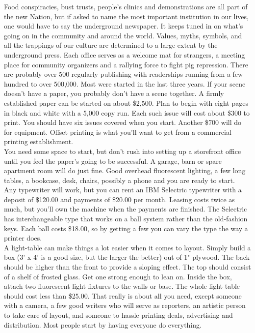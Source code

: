 \documentclass[11pt,twoside,a4paper]{book}
\begin{document}
Food conspiracies, bust trusts, people's clinics and demonstrations are all part of the new Nation, but if asked to name the most important institution in our lives, one would have to say the underground newspaper. It keeps tuned in on what's going on in the community and around the world. Values, myths, symbols, and all the trappings of our culture are determined to a large extent by the underground press. Each office serves as a welcome mat for strangers, a meeting place for community organizers and a rallying force to fight pig repression. There are probably over 500 regularly publishing with readerships running from a few hundred to over 500,000. Most were started in the last three years. If your scene doesn't have a paper, you probably don't have a scene together. A firmly established paper can be started on about \$2,500. Plan to begin with eight pages in black and white with a 5,000 copy run. Each such issue will cost about \$300 to print. You should have six issues covered when you start. Another \$700 will do for equipment. Offset printing is what you'll want to get from a commercial printing establishment.~\\

You need some space to start, but don't rush into setting up a storefront office until you feel the paper's going to be successful. A garage, barn or spare apartment room will do just fine. Good overhead fluorescent lighting, a few long tables, a bookcase, desk, chairs, possibly a phone and you are ready to start.~\\

Any typewriter will work, but you can rent an IBM Selectric typewriter with a deposit of \$120.00 and payments of \$20.00 per month. Leasing costs twice as much, but you'll own the machine when the payments are finished. The Selectric has interchangeable type that works on a ball system rather than the old-fashion keys. Each ball costs \$18.00, so by getting a few you can vary the type the way a printer does.~\\

A light-table can make things a lot easier when it comes to layout. Simply build a box (3' x 4' is a good size, but the larger the better) out of 1" plywood. The back should be higher than the front to provide a sloping effect. The top should consist of a shelf of frosted glass. Get one strong enough to lean on. Inside the box, attach two fluorescent light fixtures to the walls or base. The whole light table should cost less than \$25.00. That really is about all you need, except someone with a camera, a few good writers who will serve as reporters, an artistic person to take care of layout, and someone to hassle printing deals, advertising and distribution. Most people start by having everyone do everything.~\\
\end{document}
